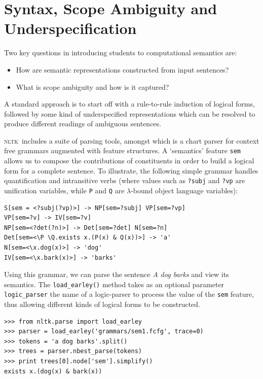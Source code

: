 \documentclass[11pt,a4paper]{article}
\newcommand{\NLTK}{\textsc{nltk}}
\newcommand{\dhgcode}[1]{{\tt #1}}
\begin{document}


\section{Syntax, Scope Ambiguity and Underspecification}

Two key questions in introducing students to computational semantics are:
\begin{itemize}
\item How are semantic representations constructed from input sentences?
\item What is scope ambiguity and how is it captured?
\end{itemize}
A standard approach is to start off with a rule-to-rule induction of
logical forms, followed by some kind of underspecified representations
which can be resolved to produce different readings of ambiguous
sentences. 

\NLTK\ includes a suite of parsing tools, amongst which is a chart
parser for context free grammars augmented with feature structures. A
`semantics' feature \texttt{sem} allows us to compose the
contributions of constituents in order to build a logical form for a
complete sentence.  To illustrate, the following simple grammar
handles quantification and intransitive verbs (where values such as
\texttt{?subj} and \texttt{?vp} are unification variables, while
\texttt{P} and \texttt{Q} are $\lambda$-bound object language
variables):

\begin{verbatim}
S[sem = <?subj(?vp)>] -> NP[sem=?subj] VP[sem=?vp]
VP[sem=?v] -> IV[sem=?v]
NP[sem=<?det(?n)>] -> Det[sem=?det] N[sem=?n]
Det[sem=<\P \Q.exists x.(P(x) & Q(x))>] -> 'a'
N[sem=<\x.dog(x)>] -> 'dog'
IV[sem=<\x.bark(x)>] -> 'barks'
\end{verbatim}
Using this grammar, we can parse the sentence \textit{A dog barks} and view
its semantics. 
The \dhgcode{load\_earley()} method
takes as an optional parameter \dhgcode{logic\_parser} the name of a
logic-parser to process the value of the \texttt{sem} feature, thus
allowing different kinds of logical forms to be constructed.
\begin{verbatim}
>>> from nltk.parse import load_earley
>>> parser = load_earley('grammars/sem1.fcfg', trace=0)
>>> tokens = 'a dog barks'.split()
>>> trees = parser.nbest_parse(tokens)
>>> print trees[0].node['sem'].simplify()
exists x.(dog(x) & bark(x))
\end{verbatim}
\end{document}
